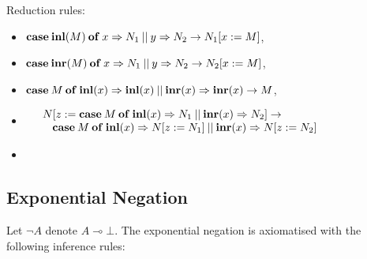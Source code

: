 \documentclass[8pt]{article}
\theoremstyle{definition}
\theoremstyle{definition}
\theoremstyle{definition}
\theoremstyle{definition}
\theoremstyle{definition}
\theoremstyle{definition}
\theoremstyle{definition}
\theoremstyle{definition}
\theoremstyle{definition}
\theoremstyle{definition}
\theoremstyle{definition}
\theoremstyle{definition}
\theoremstyle{definition}
\theoremstyle{definition}
\theoremstyle{question}
\begin{document}
    \begin{prooftree}
    \end{prooftree}

    \begin{prooftree}
    \end{prooftree}

Reduction rules:
\begin{itemize}
  \item ${\bf case} \: {\bf inl}(M) \: {\bf of} \: x \Rightarrow N_1 \: || \: y \Rightarrow N_2 \to N_1 [x := M]$,
  \item ${\bf case} \: {\bf inr}(M) \: {\bf of} \: x \Rightarrow N_1 \: || \: y \Rightarrow N_2 \to N_2 [x := M]$,
  \item ${\bf case} \: M \: {\bf of} \: {\bf inl}(x) \Rightarrow {\bf inl}(x) \: || \: {\bf inr}(x) \Rightarrow {\bf inr}(x) \to M$,
  \item $\begin{array}{lll}
    & N[z := {\bf case} \: M \: {\bf of} \: {\bf inl}(x) \Rightarrow N_1 \: || \: {\bf inr}(x) \Rightarrow N_2 ] \to& \\
    & \:\:\:\: {\bf case} \: M \: {\bf of} \: {\bf inl}(x) \Rightarrow N [z := N_1 ]\: || \: {\bf inr}(x) \Rightarrow N [z := N_2] &
  \end{array}$
  \item 
\end{itemize}

\subsection{Exponential Negation}

Let $\neg A$ denote $A \multimap \bot$. The exponential negation is axiomatised with the following inference rules:

\vspace{\baselineskip}
\end{document}
